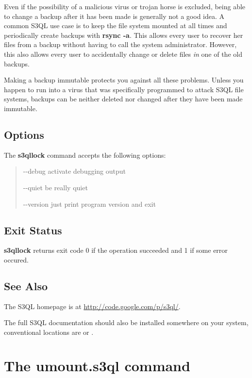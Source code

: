 \documentclass[letterpaper,10pt,english]{sphinxmanual}
\begin{document}
Even if the possibility of a malicious virus or trojan horse is
excluded, being able to change a backup after it has been made is
generally not a good idea. A common S3QL use case is to keep the file
system mounted at all times and periodically create backups with
\textbf{rsync -a}. This allows every user to recover her files from a
backup without having to call the system administrator. However, this
also allows every user to accidentally change or delete files \emph{in} one
of the old backups.

Making a backup immutable protects you against all these problems.
Unless you happen to run into a virus that was specifically programmed
to attack S3QL file systems, backups can be neither deleted nor
changed after they have been made immutable.


\subsection{Options}
\label{man/lock:options}
The \textbf{s3qllock} command accepts the following options:
\begin{quote}
\begin{optionlist}{3cm}
\item [-{-}debug]  
activate debugging output
\item [-{-}quiet]  
be really quiet
\item [-{-}version]  
just print program version and exit
\end{optionlist}
\end{quote}


\subsection{Exit Status}
\label{man/lock:exit-status}
\textbf{s3qllock} returns exit code 0 if the operation succeeded and 1 if some
error occured.


\subsection{See Also}
\label{man/lock:see-also}
The S3QL homepage is at \href{http://code.google.com/p/s3ql/}{http://code.google.com/p/s3ql/}.

The full S3QL documentation should also be installed somewhere on your
system, conventional locations are  or
.


\section{The \textbf{umount.s3ql} command}
\label{man/umount::doc}\label{man/umount:the-umount-s3ql-command}
\end{document}
